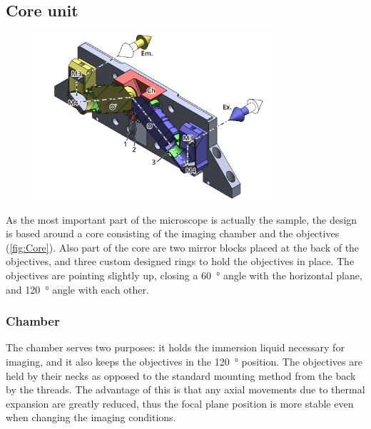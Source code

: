   \subsection{Core unit}
  \label{sec:core}
    \begin{figure}
      \centering
      \includegraphics[width=0.8\textwidth]{SW/frontRender.png}
      \label{fig:Core}
    \end{figure}

    As the most important part of the microscope is actually the sample, the design is based around a core consisting of the imaging chamber and the objectives (\autoref{fig:Core}). Also part of the core are two mirror blocks placed at the back of the objectives, and three custom designed rings to hold the objectives in place. The objectives are pointing slightly up, closing a \SI{60}{\degree} angle with the horizontal plane, and \SI{120}{\degree} angle with each other. 

    \subsubsection{Chamber}
    The chamber serves two purposes: it holds the immersion liquid necessary for imaging, and it also keeps the objectives in the \SI{120}{\degree} position. The objectives are held by their necks as opposed to the standard mounting method from the back by the threads. The advantage of this is that any axial movements due to thermal expansion are greatly reduced, thus the focal plane position is more stable even when changing the imaging conditions.

